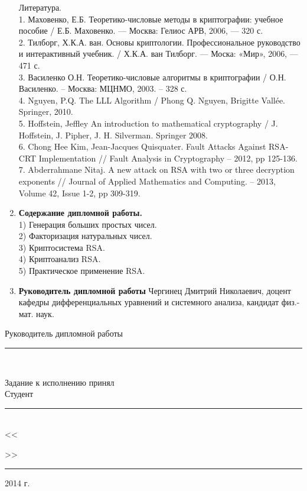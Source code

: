 \begin{titlepage}
\begin{enumerate}
			Литература. \\
				1. Маховенко, Е.Б. Теоретико-числовые методы в криптографии: учебное пособие /  Е.Б. Маховенко. — Москва: Гелиос АРВ, 2006, — 320 с. \\
				2. Тилборг, Х.К.А. ван. Основы криптологии. Профессиональное руководство и интерактивный учебник. /  Х.К.А. ван Тилборг. — Моска: «Мир», 2006, — 471 с. \\
				3. Василенко О.Н. Теоретико-числовые алгоритмы в криптографии / О.Н. Василенко. – Москва: МЦНМО, 2003. – 328 с. \\
				4. Nguyen, P.Q. The LLL Algorithm / Phong Q. Nguyen, Brigitte Vallée. Springer, 2010. \\
				5. Hoffstein, Jeffley An introduction to mathematical cryptography / J. Hoffstein, J. Pipher, J. H. Silverman. Springer 2008.  \\
				6. Chong Hee Kim, Jean-Jacques Quisquater. Fault Attacks Against RSA-CRT Implementation // Fault Analysis in Cryptography – 2012, pp 125-136. \\
				7. Abderrahmane Nitaj. A new attack on RSA with two or three decryption exponents // Journal of Applied Mathematics and Computing. – 2013, Volume 42, Issue 1-2, pp 309-319.			
		\item \textbf{Содержание дипломной работы.} \\
			1) Генерация больших простых чисел. \\
			2) Факторизация натуральных чисел. \\
			3) Криптосистема RSA. \\
			4) Криптоанализ RSA. \\
			5) Практическое применение RSA. 
		\item \textbf{Руководитель дипломной работы} Чергинец Дмитрий Николаевич, доцент кафедры дифференциальных уравнений и системного анализа, кандидат физ.-мат. наук.
	\end{enumerate}

	\vspace{0.5cm}

	\begin{flushleft}
		Руководитель дипломной работы \rule{7cm}{0.1pt} \\

		\vspace{0.25cm}

		Задание к исполнению принял \\
		Студент \rule{7cm}{0.1pt} \\
		<<\rule{0,75cm}{0.1pt}>> \rule{4cm}{0.1pt} 2014 г.
	\end{flushleft}

\end{titlepage}